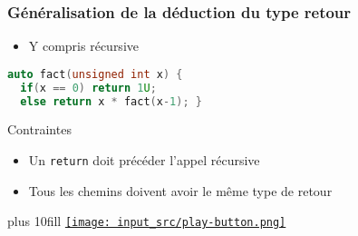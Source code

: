 \documentclass[C++.tex]{subfiles}
\begin{document}
\begin{frame}[fragile]
	\frametitle{Généralisation de la déduction du type retour}
	\begin{itemize}
		\item Y compris récursive
	\end{itemize}

	\begin{lstlisting}[language=C++]
auto fact(unsigned int x) {
  if(x == 0) return 1U;
  else return x * fact(x-1); }\end{lstlisting}

	\begin{alertblock}{Contraintes}
		\begin{itemize}
			\item Un \lstinline|return| doit précéder l'appel récursive
			\item Tous les chemins doivent avoir le même type de retour
		\end{itemize}
	\end{alertblock}

	\vskip 10mm plus 10fill
	\hfill
	\href{https://godbolt.org/#g:!((g:!((g:!((h:codeEditor,i:(filename:'1',fontScale:14,fontUsePx:'0',j:1,lang:c%2B%2B,selection:(endColumn:1,endLineNumber:26,positionColumn:1,positionLineNumber:26,selectionStartColumn:1,selectionStartLineNumber:1,startColumn:1,startLineNumber:1),source:'%23include+%3Ciostream%3E%0A%0Astatic+auto+bar(int+x)%0A%7B%0A++if(x+%3E%3D+0)+return+2+*+x%3B%0A++else+return+-2+*+x%3B%0A%7D%0A%0Astatic+auto+fact(unsigned+int+x)%0A%7B%0A++if(x+%3D%3D+0)+return+1U%3B%0A++else+return+x+*+fact(x-1)%3B%0A%7D%0A%0Aint+main()%0A%7B%0A++%7B%0A++++std::cout+%3C%3C+bar(5)+%3C%3C+!'%5Cn!'%3B%0A++++std::cout+%3C%3C+bar(-2)+%3C%3C+!'%5Cn!'%3B%0A++%7D%0A%0A++%7B%0A++++std::cout+%3C%3C+fact(4)+%3C%3C+!'%5Cn!'%3B%0A++%7D%0A%7D%0A'),l:'5',n:'0',o:'C%2B%2B+source+%231',t:'0')),k:50,l:'4',n:'0',o:'',s:0,t:'0'),(g:!((h:executor,i:(argsPanelShown:'1',compilationPanelShown:'0',compiler:g122,compilerName:'',compilerOutShown:'0',execArgs:'',execStdin:'',fontScale:14,fontUsePx:'0',j:1,lang:c%2B%2B,libs:!((name:boost,ver:'175')),options:'-std%3Dc%2B%2B14+-Wall+-Wextra',source:1,stdinPanelShown:'1',tree:'1',wrap:'0'),l:'5',n:'0',o:'Executor+x86-64+gcc+12.2+(C%2B%2B,+Editor+%231)',t:'0')),header:(),k:50,l:'4',n:'0',o:'',s:0,t:'0')),l:'2',n:'0',o:'',t:'0')),version:4}{\texttt{[image: input\_src/play-button.png]}}
\end{frame}
\end{document}
